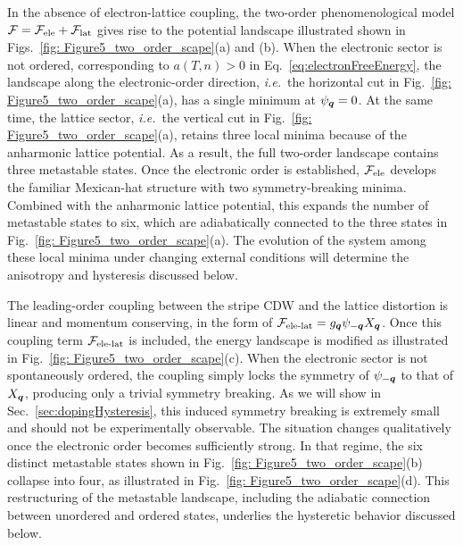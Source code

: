\documentclass[aps,prx,article,twocolumn,amsmath,amssymb,superscriptaddress,longbibliography]{revtex4-2}
\begin{document}
In the absence of electron-lattice coupling, the two-order phenomenological model $\mathcal{F}=\mathcal{F}_{\rm ele}+\mathcal{F}_{\rm lat}$ gives rise to the potential landscape illustrated shown in Figs.~\ref{fig: Figure5_two_order_scape}(a) and (b). When the electronic sector is not ordered, corresponding to $a(T,n)>0$ in Eq.~\eqref{eq:electronFreeEnergy}, the landscape along the electronic-order direction, \textit{i.e.}~the horizontal cut in Fig.~\ref{fig: Figure5_two_order_scape}(a), has a single minimum at $\psi_{\vb*{q}}=0$. At the same time, the lattice sector, \textit{i.e.}~the vertical cut in Fig.~\ref{fig: Figure5_two_order_scape}(a), retains three local minima because of the anharmonic lattice potential. As a result, the full two-order landscape contains three metastable states. Once the electronic order is established, $\mathcal{F}_{\rm ele}$ develops the familiar Mexican-hat structure with two symmetry-breaking minima. Combined with the anharmonic lattice potential, this expands the number of metastable states to six, which are adiabatically connected to the three states in Fig.~\ref{fig: Figure5_two_order_scape}(a). The evolution of the system among these local minima under changing external conditions will determine the anisotropy and hysteresis discussed below.


The leading-order coupling between the stripe CDW and the lattice distortion is linear and momentum conserving, in the form of $\mathcal{F}_{\rm ele\text{-}lat} = g_{\vb*{q}} \psi_{-\vb*{q}} X_{\vb*{q}}$. Once this coupling term $\mathcal{F}_{\rm ele\text{-}lat}$ is included, the energy landscape is modified as illustrated in Fig.~\ref{fig: Figure5_two_order_scape}(c).  When the electronic sector is not spontaneously ordered, the coupling simply locks the symmetry of $\psi_{-\vb*{q}}$ to that of $X_{\vb*{q}}$, producing only a trivial symmetry breaking. As we will show in Sec.~\ref{sec:dopingHysteresis}, this induced symmetry breaking is extremely small and should not be experimentally observable. The situation changes qualitatively once the electronic order becomes sufficiently strong. In that regime, the six distinct metastable states shown in Fig.~\ref{fig: Figure5_two_order_scape}(b) collapse into four, as illustrated in Fig.~\ref{fig: Figure5_two_order_scape}(d). This restructuring of the metastable landscape, including the adiabatic connection between unordered and ordered states, underlies the hysteretic behavior discussed below.
\end{document}
